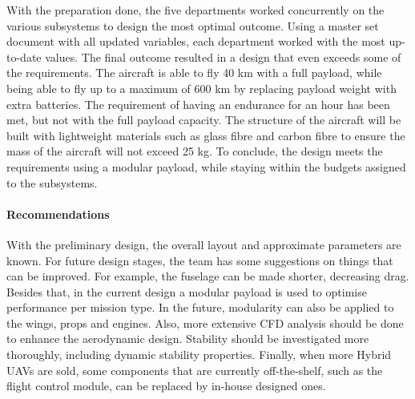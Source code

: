 With the preparation done, the five departments worked concurrently on the various subsystems to design the most optimal outcome. Using a master set document with all updated variables, each department worked with the most up-to-date values. The final outcome resulted in a design that even exceeds some of the requirements. The aircraft is able to fly 40 km with a full payload, while being able to fly up to a maximum of 600 km by replacing payload weight with extra batteries. The requirement of having an endurance for an hour has been met, but not with the full payload capacity. The structure of the aircraft will be built with lightweight materials such as glass fibre and carbon fibre to ensure the mass of the aircraft will not exceed 25 kg. To conclude, the design meets the requirements using a modular payload, while staying within the budgets assigned to the subsystems.


\paragraph{Recommendations} With the preliminary design, the overall layout and approximate parameters are known.  For future design stages, the team has some suggestions on things that can be improved. For example, the fuselage can be made shorter, decreasing drag. Besides that, in the current design a modular payload is used to optimise performance per mission type. In the future, modularity can also be applied to the wings, props and engines. Also, more extensive CFD analysis should be done to enhance the aerodynamic design. Stability should be investigated more thoroughly, including dynamic stability properties. Finally, when more Hybrid UAVs are sold, some components that are currently off-the-shelf, such as the flight control module, can be replaced by in-house designed ones.

